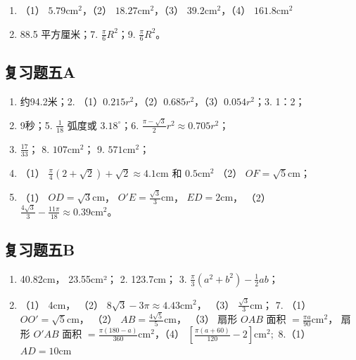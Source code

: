 \begin{enumerate}
\item
  （1） \(5.79\mathrm{cm}^2\)，（2） \(18.27\mathrm{cm}^2\)，（3）
  \(39.2\mathrm{cm}^2\)，（4） \(161.8\mathrm{cm}^2\)
\item
  88.5 平方厘米；7. \(\frac{\pi}{6} R^2\)；9. \(\frac{\pi}{6} R^2\)。
\end{enumerate}

\subsection{复习题五A}

\begin{enumerate}
\item
  约94.2米；2.
  （1）\(0.215r^2\)，（2）\(0.685r^2\)，（3）\(0.054r^2\)；3. 1：2；
\item
  9秒；5. \(\frac{1}{18}\) 弧度或 \(3.18^{\circ}\)；6.
  \(\frac{\pi - \sqrt{3}}{2} r^{2} \approx 0.705r^{2}\)；
\item
  \(\frac{17}{33}\)； 8. \(107\mathrm{cm}^2\)； 9.
  \(571\mathrm{cm}^2\)；
\item
  （1）
  \(\frac{\pi}{4} (2 + \sqrt{2}) + \sqrt{2} \approx 4.1\mathrm{cm}\) 和
  \(0.5\mathrm{cm}^2\) （2） \(OF = \sqrt{5}\mathrm{cm}\)；
\item
  （1） \(OD = \sqrt{3}\mathrm{cm}\)，
  \(O'E = \frac{\sqrt{3}}{3}\mathrm{cm}\)， \(ED = 2\mathrm{cm}\)，
  （2）
  \(\frac{4\sqrt{3}}{3} - \frac{11\pi}{18} \approx 0.39\mathrm{cm}^2\)。
\end{enumerate}

\subsection{复习题五B}

\begin{enumerate}
\item
  40.82cm， 23.55cm²； 2. 123.7cm； 3.
  \(\frac{\pi}{3} (a^2 + b^2) - \frac{1}{2} ab\)；
\item
  （1） 4cm， （2） \(8\sqrt{3} - 3\pi \approx 4.43\mathrm{cm}^2\)，
  （3） \(\frac{\sqrt{3}}{3}\mathrm{cm}\)； 7. （1）
  \(OO' = \sqrt{5}\mathrm{cm}\)， （2）
  \(AB = \frac{4\sqrt{5}}{5}\mathrm{cm}\)， （3） 扇形 \(OAB\) 面积
  \(= \frac{\pi a}{90}\mathrm{cm}^2\)， 扇形 \(O'AB\) 面积
  \(= \frac{\pi(180 - a)}{360}\mathrm{cm}^2\)，（4）
  \(\left[\frac{\pi(a + 60)}{120} -2\right]\mathrm{cm}^2;\) 8.（1）
  \(AD = 10\mathrm{cm}\)
\end{enumerate}

